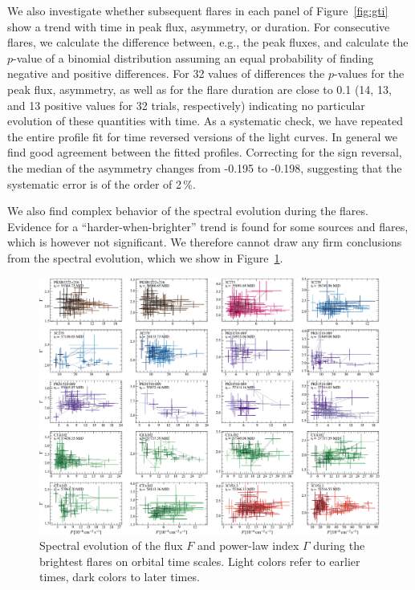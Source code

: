 \documentclass[twocolumn,linenumbers]{aastex62}
\begin{document}
We also investigate whether subsequent flares in each panel of Figure~\ref{fig:gti} show a trend with time in peak flux, asymmetry, or duration. 
For consecutive flares, we calculate the difference between, e.g., the peak fluxes, and calculate the $p$-value of a binomial distribution assuming an equal probability of finding negative and positive differences.
For 32 values of differences the $p$-values for the peak flux, asymmetry, as well as for the flare duration are close to 0.1 (14, 13, and 13 positive values for 32 trials, respectively) indicating no particular evolution of these quantities with time. 
As a systematic check, we have repeated the entire profile fit for time reversed versions of the light curves. In general we find good agreement between the fitted profiles. Correcting for the sign reversal, the median of the asymmetry changes from -0.195 to -0.198, suggesting that the systematic error is of the order of 2\,\%. 

We also find complex behavior of the spectral evolution during the flares. Evidence for a  ``harder-when-brighter'' trend is found for some sources and flares, which is however not significant. 
We therefore cannot draw any firm conclusions from the spectral evolution, which we show 
in Figure~\ref{fig:specvar}. 

\begin{figure}
    \centering
    \includegraphics[width = .9 \linewidth]{lc_specvar_flare_int.pdf}
    \caption{Spectral evolution of the flux $F$ and power-law index $\Gamma$ during the brightest flares on orbital time scales. Light colors refer to earlier times, dark colors to later times.}
    \label{fig:specvar}
\end{figure}
\end{document}
